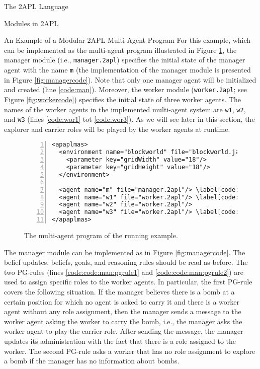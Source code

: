 \begin{chapter}{The 2APL Language}
\begin{section}{Modules in 2APL}
\begin{subsection}{An Example of a Modular 2APL Multi-Agent Program}
For this example, which can be implemented as the multi-agent
program illustrated in Figure \ref{fig:mas}, the manager module
(i.e., \texttt{manager.2apl}) specifies the initial state of the
manager agent with the name \texttt{m} (the implementation of the
manager module is presented in Figure \ref{fig:managercode}). Note
that only one manager agent will be initialized and created (line
\ref{code:man}). Moreover, the worker module (\texttt{worker.2apl};
see Figure \ref{fig:workercode}) specifies the initial state of
three worker agents. The names of the worker agents in the
implemented multi-agent system are \texttt{w1}, \texttt{w2}, and
\texttt{w3} (lines \ref{code:wor1} tot \ref{code:wor3}). As we will
see later in this section, the explorer and carrier roles will be
played by the worker agents at runtime.

\begin{figure}[H]
\begin{Verbatim}[frame=single,numbers=left,numbersep=2pt,commandchars=\\\[\]]
<apaplmas>
  <environment name="blockworld" file="blockworld.jar">
    <parameter key="gridWidth" value="18"/>
    <parameter key="gridHeight" value="18"/>
  </environment>

  <agent name="m" file="manager.2apl"/> \label[code:man]
  <agent name="w1" file="worker.2apl"/> \label[code:wor1]
  <agent name="w2" file="worker.2apl"/>
  <agent name="w3" file="worker.2apl"/> \label[code:wor3]
</apaplmas>
\end{Verbatim}
\caption{The multi-agent program of the running
example.}\label{fig:mas}
\end{figure}

The manager module can be implemented as in Figure
\ref{fig:managercode}. The belief updates, beliefs, goals, and
reasoning rules should be read as before. The two PG-rules (lines
\ref{code:code:man:pgrule1} and \ref{code:code:man:pgrule2}) are
used to assign specific roles to the worker agents. In particular,
the first PG-rule covers the following situation. If the manager
believes there is a bomb at a certain position for which no agent is
asked to carry it and there is a worker agent without any role
assignment, then the manager sends a message to the worker agent
asking the worker to carry the bomb, i.e., the manager asks the
worker agent to play the carrier role. After sending the message,
the manager updates its administration with the fact that there is a
role assigned to the worker. The second PG-rule asks a worker that
has no role assignment to explore a bomb if the manager has no
information about bombs.


\end{subsection}
\end{section}
\end{chapter}
